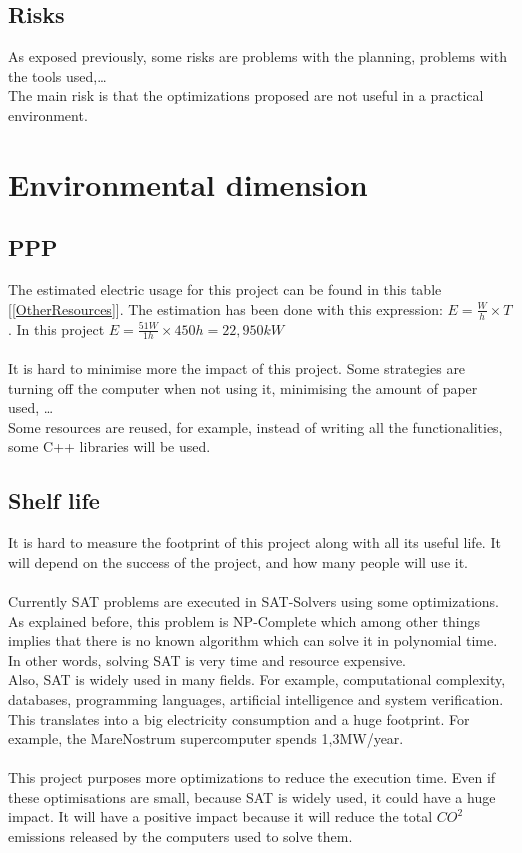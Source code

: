 \subsection{Risks}
As exposed previously, some risks are problems with the planning, problems with the tools used,\ldots\\
The main risk is that the optimizations proposed are not useful in a practical environment. 

\section{Environmental dimension}
\subsection{PPP}
The estimated electric usage for this project can be found in this table [\ref{OtherResources}]. The estimation has been done with this expression: $E=\frac{W}{h} \times T$. In this project $E=\frac{51W}{1h}\times 450h = 22,950kW$\\\\
It is hard to minimise more the impact of this project. Some strategies are turning off the computer when not using it, minimising the amount of paper used, \ldots\\
Some resources are reused, for example, instead of writing all the functionalities, some C++ libraries will be used.
\subsection{Shelf life}
It is hard to measure the footprint of this project along with all its useful life. It will depend on the success of the project, and how many people will use it. \\\\
Currently SAT problems are executed in SAT-Solvers using some optimizations. As explained before, this problem is NP-Complete which among other things implies that there is no known algorithm which can solve it in polynomial time. In other words, solving SAT is very time and resource expensive. \\
Also, SAT is widely used in many fields. For example, computational complexity, databases, programming languages, artificial intelligence and system verification. This translates into a big electricity consumption and a huge footprint. For example, the MareNostrum \cite{MareNostrum} supercomputer spends 1,3MW/year. \\\\
This project purposes more optimizations to reduce the execution time. Even if these optimisations are small, because SAT is widely used, it could have a huge impact. It will have a positive impact because it will reduce the total $CO^2$ emissions released by the computers used to solve them.

